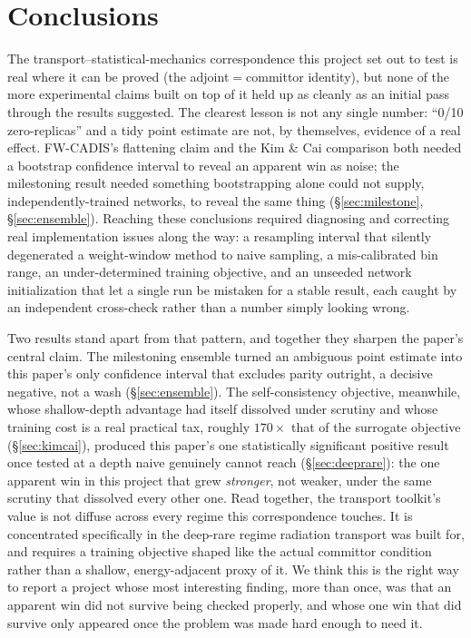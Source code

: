 \documentclass[a4paper,fleqn]{cas-sc}
\begin{document}
\FloatBarrier

\section{Conclusions}\label{sec:conclusions}
The transport--statistical-mechanics correspondence this project set out to test is real
where it can be proved (the adjoint$=$committor identity), but none of the more
experimental claims built on top of it held up as cleanly as an initial pass through the
results suggested. The clearest lesson is not any single number: ``0/10 zero-replicas''
and a tidy point estimate are not, by themselves, evidence of a real effect. FW-CADIS's
flattening claim and the Kim \& Cai comparison both needed a bootstrap confidence interval
to reveal an apparent win as noise; the milestoning result needed something bootstrapping
alone could not supply, independently-trained networks, to reveal the same thing
(\S\ref{sec:milestone}, \S\ref{sec:ensemble}). Reaching these conclusions required
diagnosing and correcting real implementation issues along the way: a resampling
interval that silently degenerated a weight-window method to naive sampling, a
mis-calibrated bin range, an under-determined training objective, and an unseeded
network initialization that let a single run be mistaken for a stable result, each
caught by an independent cross-check rather than a number simply looking wrong.

Two results stand apart from that pattern, and together they sharpen the paper's central
claim. The milestoning ensemble turned an ambiguous point estimate into this paper's only
confidence interval that excludes parity outright, a decisive negative, not a wash
(\S\ref{sec:ensemble}). The self-consistency objective, meanwhile, whose shallow-depth
advantage had itself dissolved under scrutiny and whose training cost is a real practical
tax, roughly $170\times$ that of the surrogate objective (\S\ref{sec:kimcai}), produced this paper's
one statistically significant positive result once tested at a depth naive genuinely
cannot reach (\S\ref{sec:deeprare}): the one apparent win in this project that grew
\emph{stronger}, not weaker, under the same scrutiny that dissolved every other one. Read
together, the transport toolkit's value is not diffuse across every regime this
correspondence touches. It is concentrated specifically in the deep-rare regime radiation
transport was built for, and requires a training objective shaped like the actual
committor condition rather than a shallow, energy-adjacent proxy of it. We think this is
the right way to report a project whose most interesting finding, more than once, was
that an apparent win did not survive being checked properly, and whose one win that did
survive only appeared once the problem was made hard enough to need it.
\end{document}
